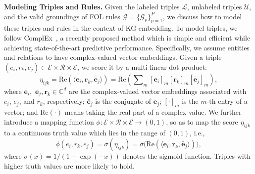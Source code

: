 \documentclass[letterpaper]{article} \usepackage{aaai18}  \usepackage{times}  \usepackage{helvet}  \usepackage{courier}  \usepackage{url}  \usepackage{graphicx}  \usepackage{amsmath}
\begin{document}
\smallskip
\noindent\textbf{Modeling Triples and Rules.} Given the labeled triples $\mathcal{L}$, unlabeled triples $\mathcal{U}$, and the valid groundings of FOL rules $\mathcal{G}=\{\mathcal{G}_p\}_{p=1}^P$, we discuss how to model these triples and rules in the context of KG embedding. To model triples, we follow ComplEx~\cite{trouillon2016:ComplEx}, a recently proposed method which is simple and efficient while achieving state-of-the-art predictive performance. Specifically, we assume entities and relations to have complex-valued vector embeddings. Given a triple $(e_i, r_k, e_j)\in\mathcal{E}\!\times\!\mathcal{R}\!\times\!\mathcal{E}$, we score it by a multi-linear dot product:
\begin{equation}\label{eq:TripleScore}
\eta_{ijk} = \textrm{Re}(\langle \mathbf{e}_i, \mathbf{r}_k, \bar{\mathbf{e}}_j\rangle) = \textrm{Re}( \sum\nolimits_{m} [\mathbf{e}_i]_m [\mathbf{r}_k]_m [\bar{\mathbf{e}}_j]_m),
\end{equation}
where $\mathbf{e}_i,$ $\mathbf{e}_j, \mathbf{r}_k \in \mathbb{C}^d$ are the complex-valued vector embeddings associated with $e_i$, $e_j$, and $r_k$, respectively; $\bar{\mathbf{e}}_j$ is the conjugate of $\mathbf{e}_j$; $[\cdot]_m$ is the $m$-th entry of a vector; and $\textrm{Re}(\cdot)$ means taking the real part of a complex value. We further introduce a mapping function $\phi: \mathcal{E}\!\times\!\mathcal{R}\!\times\!\mathcal{E} \rightarrow (0,1)$, so as to map the score $\eta_{ijk}$ to a continuous truth value which lies in the range of $(0,1)$, i.e.,
\begin{equation}\label{eq:TripleTruthValue}
\phi(e_i, r_k, e_j) = \sigma(\eta_{ijk}) = \sigma\big(\textrm{Re}(\langle \mathbf{e}_i, \mathbf{r}_k, \bar{\mathbf{e}}_j\rangle)\big),
\end{equation}
where $\sigma(x)=1/(1+\exp(-x))$ denotes the sigmoid function. Triples with higher truth values are more likely to hold.
\end{document}
